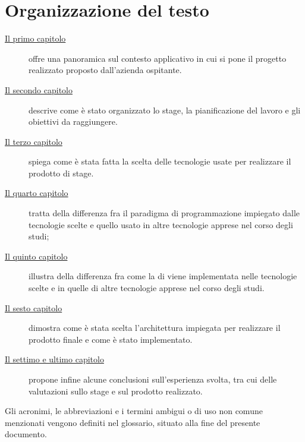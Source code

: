 \section{Organizzazione del testo}
\label{sec:organizzazione-testo}

\begin{description}
    \item[{\hyperref[cap:introduzione]{Il primo capitolo}}] offre una panoramica sul contesto applicativo in cui si pone il progetto realizzato proposto dall'azienda ospitante.

    \item[{\hyperref[cap:descrizione-stage]{Il secondo capitolo}}] descrive come è stato organizzato lo stage, la pianificazione del lavoro e gli obiettivi da raggiungere.
    
    \item[{\hyperref[cap:scelta-tecnologie]{Il terzo capitolo}}] spiega come è stata fatta la scelta delle tecnologie usate per realizzare il prodotto di stage.
    
    \item[{\hyperref[cap:confronto-paradigmi]{Il quarto capitolo}}] tratta della differenza fra il paradigma di programmazione impiegato dalle tecnologie scelte e quello usato in altre tecnologie apprese nel corso degli studi;
    
    \item[{\hyperref[cap:dependency-injection]{Il quinto capitolo}}] illustra della differenza fra come la \gls{di} viene implementata nelle tecnologie scelte e in quelle di altre tecnologie apprese nel corso degli studi.
    
    \item[{\hyperref[cap:prodotto-stage]{Il sesto capitolo}}] dimostra come è stata scelta l'architettura impiegata per realizzare il prodotto finale e come è stato implementato.

    \item[{\hyperref[cap:conclusioni]{Il settimo e ultimo capitolo}}] propone infine alcune conclusioni sull'esperienza svolta, tra cui delle valutazioni sullo stage e sul prodotto realizzato.
\end{description}
Gli acronimi, le abbreviazioni e i termini ambigui o di uso non comune menzionati vengono definiti nel glossario, situato alla fine del presente documento.